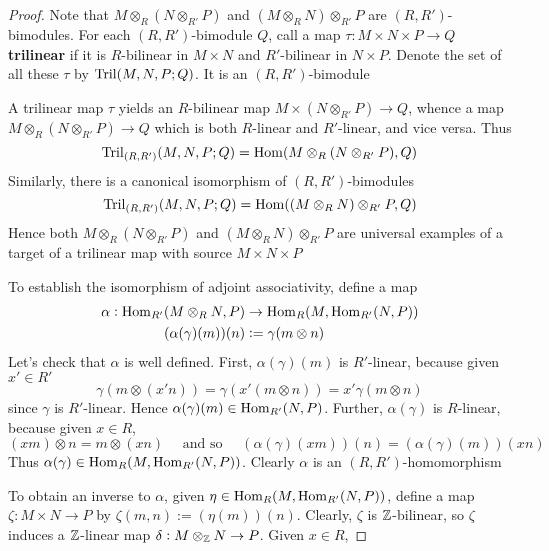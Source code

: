 \documentclass[11pt]{article}
\begin{document}
\begin{proof}
Note that \(M\otimes_R(N\otimes_{R'}P)\) and \((M\otimes_RN)\otimes_{R'}P\)
are \((R,R')\)-bimodules. For each \((R,R')\)-bimodule \(Q\), call a map
\(\tau:M\times N\times P\to Q\) \textbf{trilinear} if it is \(R\)-bilinear in \(M\times
   N\) and \(R'\)-bilinear in \(N\times P\). Denote the set of all these \(\tau\) by
\(\operatorname{Tril}(M,N,P;Q)\). It is an \((R,R')\)-bimodule

A trilinear map \(\tau\) yields an \(R\)-bilinear map \(M\times(N\otimes_{R'}P)\to
   Q\), whence a map \(M\otimes_R(N\otimes_{R'}P)\to Q\) which is both
\(R\)-linear and \(R'\)-linear, and vice versa. Thus
\begin{equation*}
\operatorname{Tril}_{(R,R')}(M,N,P;Q)=\operatorname{Hom}(M\otimes_R(N\otimes_{R'}P),Q)
\end{equation*}
Similarly, there is a canonical isomorphism of \((R,R')\)-bimodules
\begin{equation*}
\operatorname{Tril}_{(R,R')}(M,N,P;Q)=\operatorname{Hom}((M\otimes_RN)\otimes_{R'}P,Q)
\end{equation*}
Hence both \(M\otimes_R(N\otimes_{R'}P)\) and \((M\otimes_RN)\otimes_{R'}P\)
are universal examples of a target of a trilinear map with source \(M\times
   N\times P\)

To establish the isomorphism of adjoint associativity, define a map
\begin{align*}
\alpha:\operatorname{Hom}_{R'}(M\otimes_RN,P)&\to\operatorname{Hom}_R(M,\operatorname{Hom}_{R'}(N,P))\\
(\alpha(\gamma)(m))(n)&:=\gamma(m\otimes n)
\end{align*}
Let's check that \(\alpha\) is well defined. First, \(\alpha(\gamma)(m)\) is \(R'\)-linear,
because given \(x'\in R'\)
\begin{equation*}
\gamma(m\otimes(x'n))=\gamma(x'(m\otimes n))=x'\gamma(m\otimes n)
\end{equation*}
since \(\gamma\) is \(R'\)-linear. Hence \(\alpha(\gamma)(m)\in\operatorname{Hom}_{R'}(N,P)\).
Further, \(\alpha(\gamma)\) is \(R\)-linear, because given
\(x\in R\),
\begin{equation*}
(xm)\otimes n=m\otimes(xn)\quad\text{ and so }\quad
(\alpha(\gamma)(xm))(n)=(\alpha(\gamma)(m))(xn)
\end{equation*}
Thus \(\alpha(\gamma)\in\operatorname{Hom}_R(M,\operatorname{Hom}_{R'}(N,P))\). Clearly \(\alpha\) is an
\((R,R')\)-homomorphism

To obtain an inverse to \(\alpha\), given \(\eta\in\operatorname{Hom}_R(M,\operatorname{Hom}_{R'}(N,P))\), define
a map \(\zeta:M\times N\to P\) by \(\zeta(m,n):=(\eta(m))(n)\). Clearly, \(\zeta\) is
\(\mathbb{Z}\)-bilinear, so \(\zeta\) induces a \(\mathbb{Z}\)-linear map \(\delta:M\otimes_{\mathbb{Z}}N\to P\).
Given \(x\in R\),
\end{proof}
\end{document}
